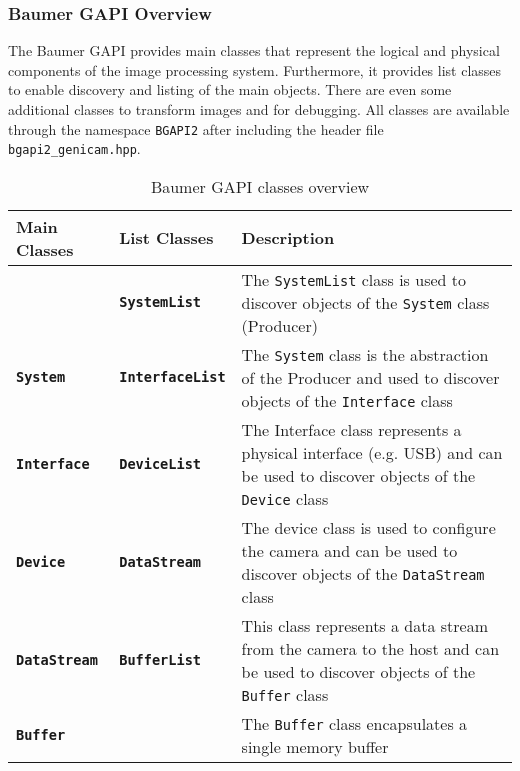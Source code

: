 \subsubsection{Baumer GAPI Overview}
\label{subsubsec:baumer_gapi_overview}

The Baumer GAPI provides main classes that represent the logical and physical components of the image processing system.
Furthermore, it provides list classes to enable discovery and listing of the main objects.
There are even some additional classes to transform images and for debugging.
All classes are available through the namespace \texttt{BGAPI2} after including the header file \texttt{bgapi2\_genicam.hpp}.

\begin{table}[H]
  \caption{Baumer GAPI classes overview}
  \label{tab:baumer_gapi}
  \centering
  \begin{tabular}{llp{8.5cm}}
    \toprule
    \textbf{Main Classes} & \textbf{List Classes} & \textbf{Description} \\
    \midrule
     & \textbf{\texttt{SystemList}} & The \texttt{SystemList} class is used to discover objects of the \texttt{System} class (Producer) \\
    \midrule
    \textbf{\texttt{System}} & \textbf{\texttt{InterfaceList}} & The \texttt{System} class is the abstraction of the Producer and used to discover objects of the \texttt{Interface} class \\
    \midrule
    \textbf{\texttt{Interface}} & \textbf{\texttt{DeviceList}} & The Interface class represents a physical interface (e.g. USB) and can be used to discover objects of the \texttt{Device} class \\
    \midrule
    \textbf{\texttt{Device}} & \textbf{\texttt{DataStream}} & The device class is used to configure the camera and can be used to discover objects of the \texttt{DataStream} class \\
    \midrule
    \textbf{\texttt{DataStream}} & \textbf{\texttt{BufferList}} & This class represents a data stream from the camera to the host and can be used to discover objects of the \texttt{Buffer} class \\
    \midrule
    \textbf{\texttt{Buffer}} &  & The \texttt{Buffer} class encapsulates a single memory buffer \\
    \bottomrule
  \end{tabular}
\end{table}
